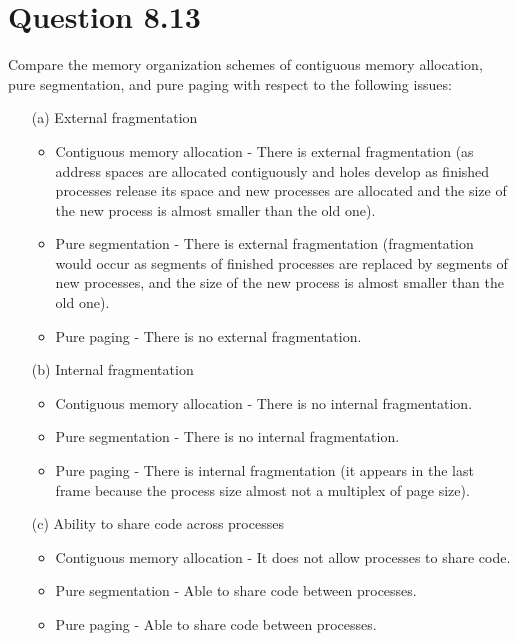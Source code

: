 \documentclass[12pt]{article}
\begin{document}
\section*{Question 8.13}{\color{blue}Compare the memory organization schemes of contiguous memory allocation, pure segmentation, and pure paging with respect to the following issues:
\begin{enumerate}
\item[(a)]External fragmentation {\color{black}
\begin{itemize}
\item Contiguous memory allocation - There is external fragmentation (as address spaces are allocated contiguously and holes develop as finished processes release its space and new processes are allocated and the size of the new process is almost smaller than the old one).
\item Pure segmentation - There is external fragmentation (fragmentation would occur as segments of finished processes are replaced by segments of new processes, and the size of the new process is almost smaller than the old one).
\item Pure paging - There is no external fragmentation.
\end{itemize}
}
\item[(b)]Internal fragmentation {\color{black}
\begin{itemize}
\item Contiguous memory allocation - There is no internal fragmentation.
\item Pure segmentation - There is no internal fragmentation.
\item Pure paging - There is internal fragmentation (it appears in the last frame because the process size almost not a multiplex of page size).
\end{itemize}
}
\item[(c)]Ability to share code across processes {\color{black}
\begin{itemize}
\item Contiguous memory allocation - It does not allow processes to share code.
\item Pure segmentation - Able to share code between processes.
\item Pure paging - Able to share code between processes.
\end{itemize}
}
\end{enumerate}
}
\end{document}
